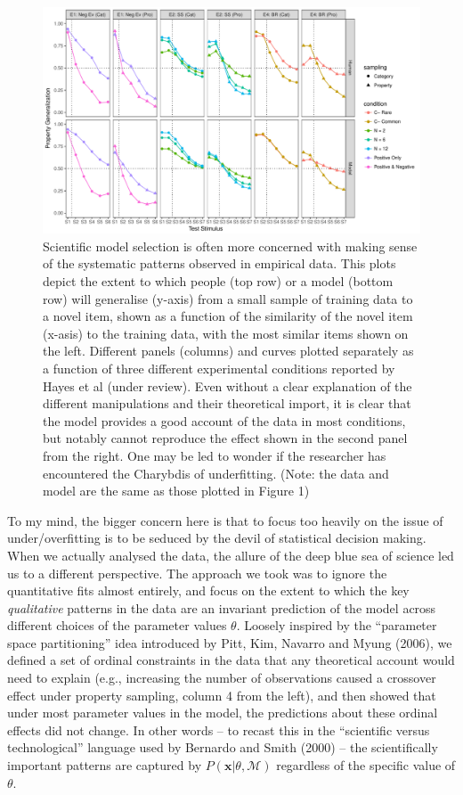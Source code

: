 \documentclass[doc]{apa6}
\theoremstyle{definition}
\theoremstyle{definition}
\theoremstyle{definition}
\theoremstyle{remark}
\begin{document}
\begin{figure}
\includegraphics{./fits_line.pdf}
\caption{Scientific model selection is often more concerned with making sense of the systematic patterns observed in empirical data. This plots depict the extent to which people (top row) or a model (bottom row) will generalise (y-axis) from a small sample of training data to a novel item, shown as a function of the similarity of the novel item (x-asis) to the training data, with the most similar items shown on the left. Different panels (columns) and curves plotted separately as a function of three different experimental conditions reported by Hayes et al (under review). Even without a clear explanation of the different manipulations and their theoretical import, it is clear that the model provides a good account of the data in most conditions, but notably cannot reproduce the effect shown in the second panel from the right. One may be led to wonder if the researcher has encountered the Charybdis of underfitting. (Note: the data and model are the same as those plotted in Figure 1)}
\end{figure}

To my mind, the bigger concern here is that to focus too heavily on the
issue of under/overfitting is to be seduced by the devil of statistical
decision making. When we actually analysed the data, the allure of the
deep blue sea of science led us to a different perspective. The approach
we took was to ignore the quantitative fits almost entirely, and focus
on the extent to which the key \emph{qualitative} patterns in the data
are an invariant prediction of the model across different choices of the
parameter values \(\theta\). Loosely inspired by the \enquote{parameter
space partitioning} idea introduced by Pitt, Kim, Navarro and Myung
(2006), we defined a set of ordinal constraints in the data that any
theoretical account would need to explain (e.g., increasing the number
of observations caused a crossover effect under property sampling,
column 4 from the left), and then showed that under most parameter
values in the model, the predictions about these ordinal effects did not
change. In other words -- to recast this in the \enquote{scientific
versus technological} language used by Bernardo and Smith (2000) -- the
scientifically important patterns are captured by
\(P(\bm{x}|\theta, \mathcal{M})\) regardless of the specific value of
\(\theta\).
\end{document}
